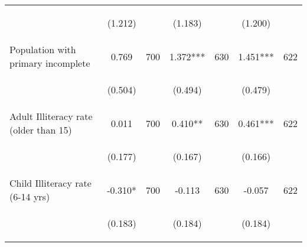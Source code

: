\begin{tabular}{lcccccc}
\vspace{4pt} &  \begin{footnotesize}(1.212)\end{footnotesize}   & &
			    \begin{footnotesize}(1.183)\end{footnotesize}   & &
			    \begin{footnotesize}(1.200)\end{footnotesize}   &
			     \\          

Population with primary incomplete   &  0.769   &  700  &   1.372***  &  630 &  1.451***  &  622   \\

\vspace{4pt} &  \begin{footnotesize}(0.504)\end{footnotesize}   & &
			    \begin{footnotesize}(0.494)\end{footnotesize}   & &
			    \begin{footnotesize}(0.479)\end{footnotesize}   &
			     \\          

Adult Illiteracy rate (older than 15)   &  0.011   &  700  &   0.410**  &  630 &  0.461***  &  622   \\

\vspace{4pt} &  \begin{footnotesize}(0.177)\end{footnotesize}   & &
			    \begin{footnotesize}(0.167)\end{footnotesize}   & &
			    \begin{footnotesize}(0.166)\end{footnotesize}   &
			     \\          

Child Illiteracy rate (6-14 yrs)   &  -0.310*   &  700  &   -0.113  &  630 &  -0.057  &  622   \\

\vspace{4pt} &  \begin{footnotesize}(0.183)\end{footnotesize}   & &
			    \begin{footnotesize}(0.184)\end{footnotesize}   & &
			    \begin{footnotesize}(0.184)\end{footnotesize}   &
			     \\          


\end{tabular}
